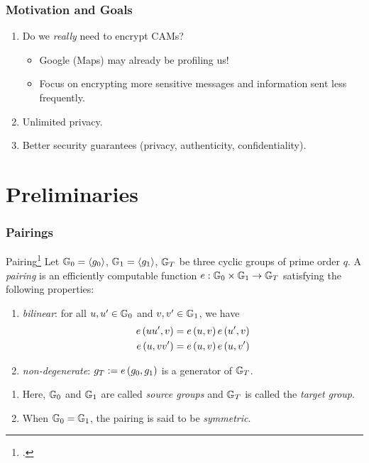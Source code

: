 \documentclass{beamer}
\begin{document}
    \begin{frame}
        \frametitle{Motivation and Goals}
        \begin{enumerate}
            \item<1-> Do we \emph{really} need to encrypt CAMs?
            \begin{itemize}
                \item Google (Maps) may already be profiling us!
                \item Focus on encrypting more sensitive messages and
                information sent less frequently.
            \end{itemize}
            \item<2-> Unlimited privacy.
            \item<3-> Better security guarantees (privacy, authenticity,
            confidentiality).
        \end{enumerate}
    \end{frame}

    \section{Preliminaries}

    \begin{frame}
        \frametitle{Pairings}
        \begin{definition}{Pairing\footcite{GraduateCourseApplied}}
            Let \(\mathbb G_0 = \left\langle g_0 \right\rangle\), \(\mathbb G_1 = \left\langle g_1 \right\rangle\), \(\mathbb G_T\) be
            three cyclic groups of prime order \(q\). A \emph{pairing} is an
            efficiently computable function \(e: \mathbb G_0 \times \mathbb G_1 \rightarrow
            \mathbb G_T\) satisfying the following properties:
            \begin{enumerate}
                \item \emph{bilinear}: for all \(u, u^{\prime} \in \mathbb G_0\) and
                \(v, v^{\prime} \in \mathbb G_1\), we have
                \begin{align}
                    e\left(uu^{\prime}, v\right) &= e\left(u,v\right)e\left(u^{\prime},v\right) \\
                    e\left(u, vv^{\prime}\right) &= e\left(u,v\right)e\left(u, v^{\prime}\right)
                \end{align}
                \item \emph{non-degenerate}: \(g_T := e\left(g_0, g_1\right)\) is a
                generator of \(\mathbb G_T\).
            \end{enumerate}
        \end{definition}
        \begin{enumerate}
            \item<2-> Here, \(\mathbb G_0\) and \(\mathbb G_1\) are called \emph{source
            groups} and \(\mathbb G_T\) is called the \emph{target group}.
            \item<3-> When \(\mathbb G_0 = \mathbb G_1\), the pairing is said to be
            \emph{symmetric}.
        \end{enumerate}
    \end{frame}
\end{document}
